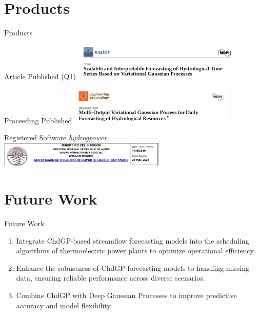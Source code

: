 \documentclass[10pt, xcolor=table]{beamer}
\let\olditem\item
\renewcommand\item{\olditem\justifying}
\begin{document}
\section*{Products}
\begin{frame}{Products}
	\begin{block}{Article Published (Q1)}
		\centering
		\includegraphics[width=0.6\textwidth]{images/article.png}
	\end{block}
	
	\begin{block}{Proceeding Published}
		\centering
		\includegraphics[width=0.6\textwidth]{images/proceeding.png}
	\end{block}

	\begin{block}{Registered Software \textit{hydrogpower}}
		\centering
		\includegraphics[width=0.6\textwidth]{images/software.png}
	\end{block}
	
\end{frame}

\section*{Future Work}
\begin{frame}{Future Work}
	\begin{enumerate}
		\item Integrate ChdGP-based streamflow forecasting models into the scheduling algorithms of thermoelectric power plants to optimize operational efficiency.
		
		\item Enhance the robustness of ChdGP forecasting models to handling missing data, ensuring reliable performance across diverse scenarios.
		
		\item Combine ChdGP with Deep Gaussian Processes to improve predictive accuracy and model flexibility.
	\end{enumerate}
\end{frame}
\end{document}
